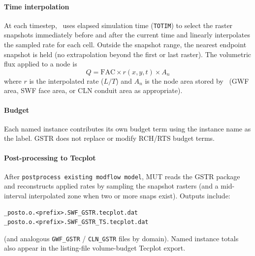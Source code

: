 \paragraph*{Time interpolation}
At each timestep, \mfus\ uses elapsed simulation time (\texttt{TOTIM}) to select the raster snapshots immediately before and after the current time and linearly interpolates the sampled rate for each cell.
Outside the snapshot range, the nearest endpoint snapshot is held (no extrapolation beyond the first or last raster).
The volumetric flux applied to a node is
\[
Q = \mathrm{FAC}\times r(x,y,t)\times A_n
\]
where $r$ is the interpolated rate ($L/T$) and $A_n$ is the node area stored by \mfus\ (GWF area, SWF face area, or CLN conduit area as appropriate).

\paragraph*{Budget}
Each named instance contributes its own budget term using the instance name as the label.
\textsf{GSTR} does not replace or modify \textsf{RCH}/\textsf{RTS} budget terms.

\paragraph*{Post-processing to Tecplot}
After \texttt{postprocess existing modflow model}, MUT reads the \textsf{GSTR} package and reconstructs applied rates by sampling the snapshot rasters (and a mid-interval interpolated zone when two or more snaps exist). Outputs include:
\begin{verbatim}
_posto.o.<prefix>.SWF_GSTR.tecplot.dat
_posto.o.<prefix>.SWF_GSTR_TS.tecplot.dat
\end{verbatim}
(and analogous \texttt{GWF\_GSTR} / \texttt{CLN\_GSTR} files by domain).
Named instance totals also appear in the listing-file volume-budget Tecplot export.
